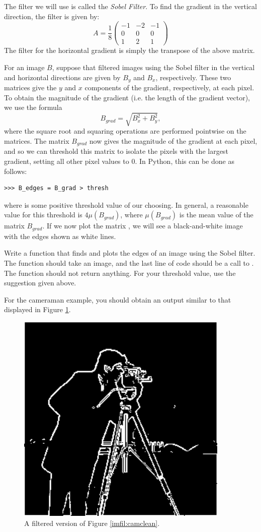 The filter we will use is called the \emph{Sobel Filter}. To find the gradient 
in the vertical direction, the filter is given by:
\[
A = \frac{1}{8}\begin{pmatrix}
-1&-2&-1\\
0&0&0\\
1&2&1
\end{pmatrix}
\]
The filter for the horizontal gradient is simply the transpose of the above matrix.

For an image $B$, suppose that filtered images using the Sobel filter in the vertical and
horizontal directions are given by $B_y$ and $B_x$, respectively. These two matrices give
the $y$ and $x$ components of the gradient, respectively, at each pixel. To obtain the 
magnitude of the gradient (i.e. the length of the gradient vector), we use the formula
$$
B_{grad} = \sqrt{B_x^2 + B_y^2},
$$
where the square root and squaring operations are performed pointwise on the matrices. 
The matrix $B_{grad}$ now gives the magnitude of the gradient at each pixel, and so we
can threshold this matrix to isolate the pixels with the largest gradient, setting all 
other pixel values to 0. 
In Python, this can be done as follows:
\begin{lstlisting}
>>> B_edges = B_grad > thresh
\end{lstlisting}
where  is some positive threshold value of our choosing. In general, a reasonable
value for this threshold is $4\mu(B_{grad})$, where $\mu(B_{grad})$ is the mean value of the 
matrix $B_{grad}$.
If we now plot the matrix , we will see a black-and-white image with the edges 
shown as white lines.

\begin{problem}
Write a function  that finds and plots the edges of an image using the Sobel filter.
The function should take an image, and the last line of code should be a call 
to . The function should not return anything. For your threshold value, use the 
suggestion given above.

For the cameraman example, you should obtain an output similar to that displayed in 
Figure \ref{imfil:edges}.
\end{problem}

\begin{figure}[h!]
\includegraphics{edges.pdf}
\caption{A filtered version of Figure \ref{imfil:camclean}.}
\label{imfil:edges}
\end{figure}


